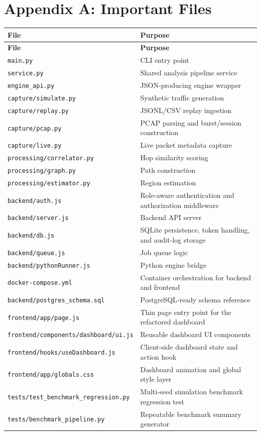 \documentclass[12pt,a4paper]{report}
\begin{document}
\chapter*{Appendix A: Important Files}
\begin{longtable}{p{5cm}p{9cm}}
\toprule
\textbf{File} & \textbf{Purpose} \\
\midrule
\endfirsthead
\toprule
\textbf{File} & \textbf{Purpose} \\
\midrule
\endhead
\texttt{main.py} & CLI entry point \\
\texttt{service.py} & Shared analysis pipeline service \\
\texttt{engine\_api.py} & JSON-producing engine wrapper \\
\texttt{capture/simulate.py} & Synthetic traffic generation \\
\texttt{capture/replay.py} & JSONL/CSV replay ingestion \\
\texttt{capture/pcap.py} & PCAP parsing and burst/session construction \\
\texttt{capture/live.py} & Live packet metadata capture \\
\texttt{processing/correlator.py} & Hop similarity scoring \\
\texttt{processing/graph.py} & Path construction \\
\texttt{processing/estimator.py} & Region estimation \\
\texttt{backend/auth.js} & Role-aware authentication and authorization middleware \\
\texttt{backend/server.js} & Backend API server \\
\texttt{backend/db.js} & SQLite persistence, token handling, and audit-log storage \\
\texttt{backend/queue.js} & Job queue logic \\
\texttt{backend/pythonRunner.js} & Python engine bridge \\
\texttt{docker-compose.yml} & Container orchestration for backend and frontend \\
\texttt{backend/postgres\_schema.sql} & PostgreSQL-ready schema reference \\
\texttt{frontend/app/page.js} & Thin page entry point for the refactored dashboard \\
\texttt{frontend/components/dashboard/ui.js} & Reusable dashboard UI components \\
\texttt{frontend/hooks/useDashboard.js} & Client-side dashboard state and action hook \\
\texttt{frontend/app/globals.css} & Dashboard animation and global style layer \\
\texttt{tests/test\_benchmark\_regression.py} & Multi-seed simulation benchmark regression test \\
\texttt{tests/benchmark\_pipeline.py} & Repeatable benchmark summary generator \\
\bottomrule
\end{longtable}
\end{document}

